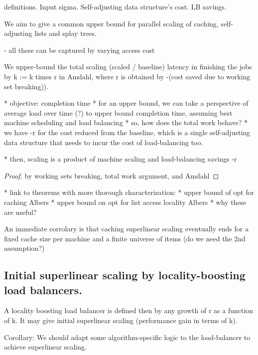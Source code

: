 definitions.
Input sigma.
Self-adjusting data structure's cost.
LB savings.

We aim to give a common upper bound for parallel scaling of caching, self-adjusting lists and splay trees.

- all these can be captured by varying access cost



\begin{theorem}
 We upper-bound the total scaling (scaled / baseline) latency in finishing the jobs by k := k times r in Amdahl, where r is obtained by -(cost saved due to working set breaking)).

* objective: completion time
* for an upper bound, we can take a perspective of average load over time (?) to upper bound completion time, assuming best machine scheduling and load balancing
* so, how does the total work behave?
    * we have -r for the cost reduced from the baseline, which is a single self-adjusting data structure that needs to incur the cost of load-balancing too.

* then, scaling is a product of machine scaling and load-balancing savings -r

 
\end{theorem}

\begin{proof}
  by working sets breaking, total work argument, and Amdahl
\end{proof}

* link to theorems with more thorough characterization:
    * upper bound of opt for caching Albers
    * upper bound on opt for list access locality Albers
    * why these are useful?


An immediate corrolary is that caching superlinear scaling eventually ends for a fixed cache size per machine and a finite universe of items (do we need the 2nd assumption?)


\subsection{Initial superlinear scaling by locality-boosting load balancers.}



A locality boosting load balancer is defined then by any growth of r as a function of k. It may give initial superlinear scaling (performance gain in terms of k).

Corollary: We should adapt some algorithm-specific logic to the load-balancer to achieve superlinear scaling.



